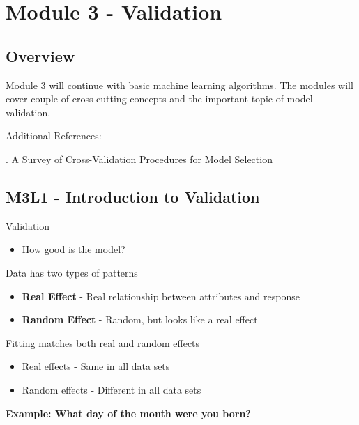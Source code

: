 \documentclass[
]{book}
\providecommand{\tightlist}{%
  \setlength{\itemsep}{0pt}\setlength{\parskip}{0pt}}
\begin{document}
\chapter{Module 3 - Validation}\label{module-3---validation}

\section{Overview}\label{overview}

Module 3 will continue with basic machine learning algorithms.
The modules will cover couple of cross-cutting concepts and the important topic of model validation.

Additional References:

. \href{https://www.di.ens.fr/willow/pdfs/2010_Arlot_Celisse_SS.pdf}{A Survey of Cross-Validation Procedures for Model Selection}

\section{M3L1 - Introduction to Validation}\label{m3l1---introduction-to-validation}

Validation

\begin{itemize}
\tightlist
\item
  How good is the model?
\end{itemize}

Data has two types of patterns

\begin{itemize}
\tightlist
\item
  \textbf{Real Effect} - Real relationship between attributes and response
\item
  \textbf{Random Effect} - Random, but looks like a real effect
\end{itemize}

Fitting matches both real and random effects

\begin{itemize}
\tightlist
\item
  Real effects - Same in all data sets
\item
  Random effects - Different in all data sets
\end{itemize}

\textbf{Example: What day of the month were you born?}
\end{document}
